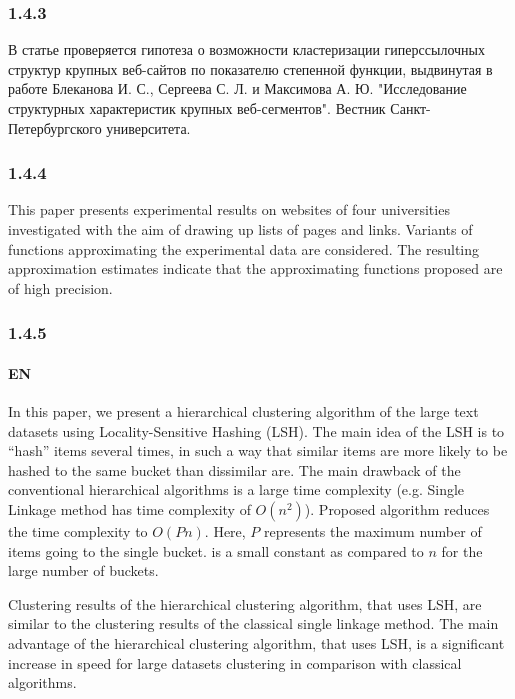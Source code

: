 \subsubsection{1.4.3}

В статье проверяется гипотеза о возможности кластеризации гиперссылочных структур крупных веб-сайтов по показателю степенной функции, выдвинутая в работе Блеканова И. С., Сергеева С. Л. и Максимова А. Ю. "Исследование структурных характеристик крупных веб-сегментов". Вестник Санкт-Петербургского университета.

\subsubsection{1.4.4}

This paper presents experimental results on websites of four universities investigated with the aim of drawing up lists of pages and links. Variants of functions approximating the experimental data are considered. The resulting approximation estimates indicate that the approximating functions proposed are of high precision.

\subsubsection{1.4.5}

\paragraph{EN} In this paper, we present a hierarchical clustering algorithm of the large text datasets using Locality-Sensitive Hashing (LSH). The main idea of the LSH is to “hash” items several times, in such a way that similar items are more likely to be hashed to the same bucket than dissimilar are. The main drawback of the conventional hierarchical algorithms is a large time complexity (e.g. Single Linkage method has time complexity of \(O(n^2)\)). Proposed algorithm reduces the time complexity to \(O(Pn)\). Here, \(P\) represents the maximum number of items going to the single bucket. is a small constant as compared to \(n\) for the large number of buckets.

Clustering results of the hierarchical clustering algorithm, that uses LSH, are similar to the clustering results of the classical single linkage method. The main advantage of the hierarchical clustering algorithm, that uses LSH, is a significant increase in speed for large datasets clustering in comparison with classical
algorithms.

